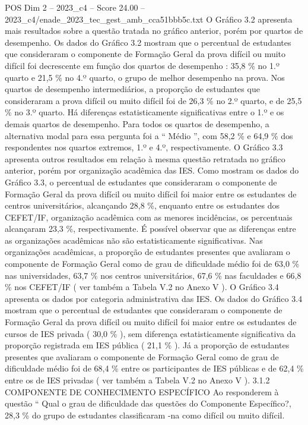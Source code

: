 \begin{textsample}{POS Dim 2 – 2023\_c4 – Score 24.00 – 2023\_c4/enade\_2023\_tec\_gest\_amb\_cca51bbb5c.txt}
O Gráfico 3.2 apresenta mais resultados sobre a questão tratada no gráfico anterior, porém por quartos de desempenho.
Os dados do Gráfico 3.2 mostram que o percentual de estudantes que consideraram o componente de Formação Geral da prova difícil ou muito difícil foi decrescente em função dos quartos de desempenho : 35,8 \% no 1.º quarto e 21,5 \% no 4.º quarto, o grupo de melhor desempenho na prova.
Nos quartos de desempenho intermediários, a proporção de estudantes que consideraram a prova difícil ou muito difícil foi de 26,3 \% no 2.º quarto, e de 25,5 \% no 3.º quarto.
Há diferenças estatisticamente significativas entre o 1.º e os demais quartos de desempenho.
Para todos os quartos de desempenho, a alternativa modal para essa pergunta foi a “ Médio ”, com 58,2 \% e 64,9 \% dos respondentes nos quartos extremos, 1.º e 4.º, respectivamente.
O Gráfico 3.3 apresenta outros resultados em relação à mesma questão retratada no gráfico anterior, porém por organização acadêmica das IES.
Como mostram os dados do Gráfico 3.3, o percentual de estudantes que consideraram o componente de Formação Geral da prova difícil ou muito difícil foi maior entre os estudantes de centros universitários, alcançando 28,8 \%, enquanto entre os estudantes dos CEFET/IF, organização acadêmica com as menores incidências, os percentuais alcançaram 23,3 \%, respectivamente.
É possível observar que as diferenças entre as organizações acadêmicas não são estatisticamente significativas.
Nas organizações acadêmicas, a proporção de estudantes presentes que avaliaram o componente de Formação Geral como de grau de dificuldade médio foi de 63,0 \% nas universidades, 63,7 \% nos centros universitários, 67,6 \% nas faculdades e 66,8 \% nos CEFET/IF ( ver também a Tabela V.2 no Anexo V ).
O Gráfico 3.4 apresenta os dados por categoria administrativa das IES.
Os dados do Gráfico 3.4 mostram que o percentual de estudantes que consideraram o componente de Formação Geral da prova difícil ou muito difícil foi maior entre os estudantes de cursos de IES privada ( 30,0 \% ), sem diferença estatisticamente significativa da proporção registrada em IES pública ( 21,1 \% ).
Já a proporção de estudantes presentes que avaliaram o componente de Formação Geral como de grau de dificuldade médio foi de 68,4 \% entre os participantes de IES públicas e de 62,4 \% entre os de IES privadas ( ver também a Tabela V.2 no Anexo V ). 3.1.2 COMPONENTE DE CONHECIMENTO ESPECÍFICO Ao responderem à questão “ Qual o grau de dificuldade das questões do Componente Específico?, 28,3 \% do grupo de estudantes classificaram -na como difícil ou muito difícil.

\end{textsample}
